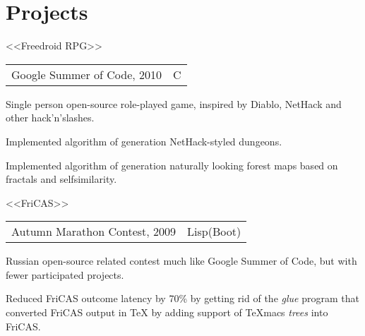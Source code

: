 \documentclass[a4paper]{article}
\begin{document}

	\section{Projects}
	\begin{multicols}{2}
		\raggedcolumns
		\begin{project}{<<Freedroid RPG>>}{\begin{tabular}{@{}l|l}Google Summer of Code, 2010 & C\\\end{tabular}}
			Single person open-source role-played game, inspired by Diablo, NetHack and other hack'n'slashes.
			\begin{items}
				\item Implemented algorithm of generation NetHack-styled dungeons.
				\item Implemented algorithm of generation naturally looking forest maps based on fractals and selfsimilarity.
			\end{items}
		\end{project}
		\begin{project}{<<FriCAS>>}{\begin{tabular}{@{}l|l}Autumn Marathon Contest, 2009 & Lisp(Boot)\\\end{tabular}}
			Russian open-source related contest much like Google Summer of Code, but with fewer participated projects.
			\begin{items}
				\item Reduced FriCAS outcome latency by 70\% by getting rid of the \emph{glue} program that converted FriCAS output in \TeX{} by adding support of TeXmacs \emph{trees} into FriCAS.
			\end{items}
		\end{project}

		\columnbreak


\end{multicols}
\end{document}
